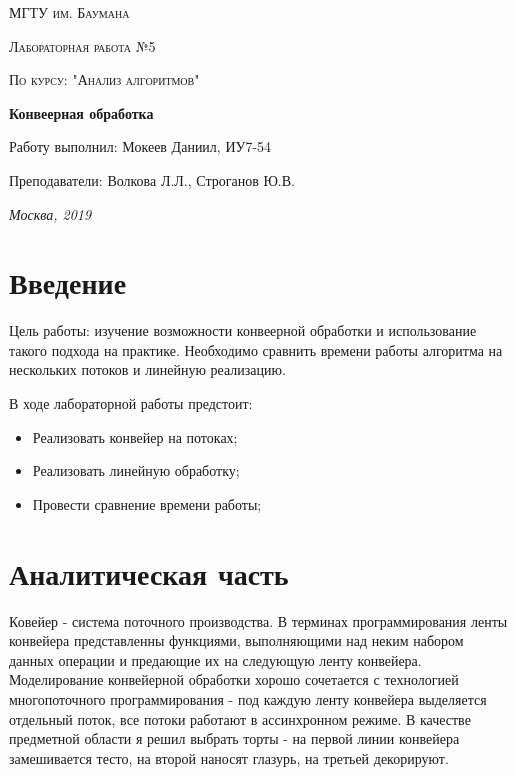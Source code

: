 \documentclass[12pt]{report}
\begin{document}
\begin{titlepage}
	\centering
	{\scshape\LARGE МГТУ им. Баумана \par}
	\vspace{3cm}
	{\scshape\Large Лабораторная работа №5\par}
	\vspace{0.5cm}	
	{\scshape\Large По курсу: "Анализ алгоритмов"\par}
	\vspace{1.5cm}
	{\huge\bfseries Конвеерная обработка\par}
	\vspace{2cm}
	\Large Работу выполнил: Мокеев Даниил, ИУ7-54\par
	\vspace{0.5cm}
	\Large Преподаватели:  Волкова Л.Л., Строганов Ю.В.\par

	\vfill
	\large \textit {Москва, 2019} \par
\end{titlepage}

\tableofcontents

\newpage
\chapter*{Введение}

Цель работы: изучение возможности конвеерной обработки и использование такого подхода на практике. Необходимо сравнить времени работы алгоритма на нескольких потоков и линейную реализацию.

В ходе лабораторной работы предстоит:
\begin{itemize}
	\item Реализовать конвейер на потоках; 
	\item Реализовать линейную обработку; 
	\item Провести сравнение времени работы;
\end{itemize}

\chapter{Аналитическая часть}
Ковейер - система поточного производства. В терминах программирования ленты конвейера представленны функциями, выполняющими над неким набором данных операции и предающие их на следующую ленту конвейера. Моделирование конвейерной обработки хорошо сочетается с технологией многопоточного программирования - под каждую ленту конвейера выделяется отдельный поток, все потоки работают в ассинхронном режиме.
В качестве предметной области я решил выбрать торты - на первой линии конвейера замешивается тесто, на второй наносят глазурь, на третьей декорируют.
\end{document}
